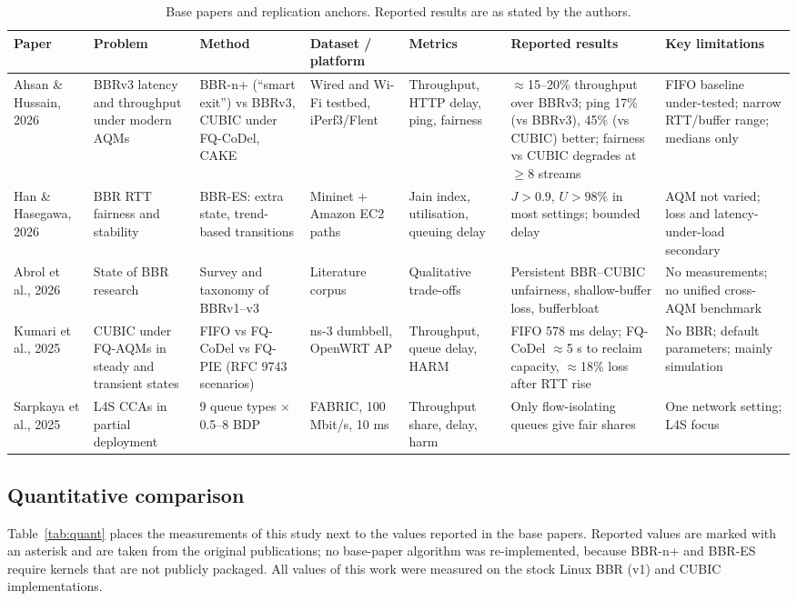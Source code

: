 \documentclass[conference]{IEEEtran}
\begin{document}
\begin{table}[t]
\centering
\caption{Base papers and replication anchors. Reported results are as stated by the authors.}
\label{tab:base}
\scriptsize
\setlength{\tabcolsep}{3pt}
\begin{tabular}{@{}p{21mm}p{23mm}p{25mm}p{21mm}p{17mm}p{30mm}p{24mm}@{}}
\toprule
Paper & Problem & Method & Dataset / platform & Metrics & Reported results & Key limitations \\
\midrule
Ahsan \& Hussain, 2026~\cite{ahsan2026bbrn} & BBRv3 latency and throughput under modern AQMs & BBR-n+ (``smart exit'') vs BBRv3, CUBIC under FQ-CoDel, CAKE & Wired and Wi-Fi testbed, iPerf3/Flent & Throughput, HTTP delay, ping, fairness & $\approx$15--20\% throughput over BBRv3; ping 17\% (vs BBRv3), 45\% (vs CUBIC) better; fairness vs CUBIC degrades at $\ge$8 streams & FIFO baseline under-tested; narrow RTT/buffer range; medians only \\
Han \& Hasegawa, 2026~\cite{han2026bbres} & BBR RTT fairness and stability & BBR-ES: extra state, trend-based transitions & Mininet + Amazon EC2 paths & Jain index, utilisation, queuing delay & $J>0.9$, $U>98\%$ in most settings; bounded delay & AQM not varied; loss and latency-under-load secondary \\
Abrol et al., 2026~\cite{abrol2026survey} & State of BBR research & Survey and taxonomy of BBRv1--v3 & Literature corpus & Qualitative trade-offs & Persistent BBR--CUBIC unfairness, shallow-buffer loss, bufferbloat & No measurements; no unified cross-AQM benchmark \\
Kumari et al., 2025~\cite{kumari2025cubic} & CUBIC under FQ-AQMs in steady and transient states & FIFO vs FQ-CoDel vs FQ-PIE (RFC 9743 scenarios) & ns-3 dumbbell, OpenWRT AP & Throughput, queue delay, HARM & FIFO 578 ms delay; FQ-CoDel $\approx$5 s to reclaim capacity, $\approx$18\% loss after RTT rise & No BBR; default parameters; mainly simulation \\
Sarpkaya et al., 2025~\cite{sarpkaya2025l4s} & L4S CCAs in partial deployment & 9 queue types $\times$ 0.5--8 BDP & FABRIC, 100 Mbit/s, 10 ms & Throughput share, delay, harm & Only flow-isolating queues give fair shares & One network setting; L4S focus \\
\bottomrule
\end{tabular}
\end{table}

\subsection{Quantitative comparison}
Table~\ref{tab:quant} places the measurements of this study next to the values reported in the base papers. Reported values are marked with an asterisk and are taken from the original publications; no base-paper algorithm was re-implemented, because BBR-n+ and BBR-ES require kernels that are not publicly packaged. All values of this work were measured on the stock Linux BBR (v1) and CUBIC implementations.
\end{document}

